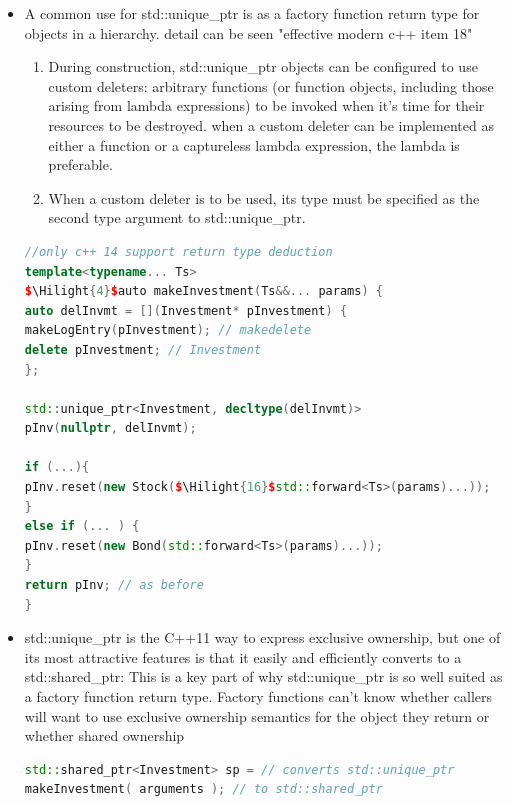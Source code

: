 \documentclass[a4paper,12pt,twoside]{book}
\newcommand{\Hilight}[1]{\makebox[0pt][l]{\color{yellow}\rule[-3pt]{#1em}{11pt}}}
\begin{document}
\begin{itemize}

\item A common use for std::unique\_ptr is as a factory function return type for objects
in a hierarchy. detail can be seen "effective modern c++ item 18"

\begin{enumerate}
\item During construction, std::unique\_ptr objects can be configured to use custom deleters: arbitrary functions (or function objects, including those arising from lambda expressions) to be invoked when it's time for their resources to be destroyed. when a custom deleter can be implemented as either a function or a captureless lambda expression, the lambda is preferable.

\item When a custom deleter is to be used, its type must be specified as the second type argument to std::unique\_ptr.
\end{enumerate}

\begin{lstlisting}[frame=single, language=c++, mathescape=true]
//only c++ 14 support return type deduction
template<typename... Ts>
$\Hilight{4}$auto makeInvestment(Ts&&... params) {
auto delInvmt = [](Investment* pInvestment) {
makeLogEntry(pInvestment); // makedelete
delete pInvestment; // Investment
};

std::unique_ptr<Investment, decltype(delInvmt)>
pInv(nullptr, delInvmt);

if (...){
pInv.reset(new Stock($\Hilight{16}$std::forward<Ts>(params)...));
}
else if (... ) {
pInv.reset(new Bond(std::forward<Ts>(params)...));
}
return pInv; // as before
}
\end{lstlisting}

\item std::unique\_ptr is the C++11 way to express exclusive ownership, but one of its
most attractive features is that it easily and efficiently converts to a std::shared\_ptr: This is a key part of why std::unique\_ptr is so well suited as a factory function return type. Factory functions can't know whether callers will want to use exclusive ownership semantics for the object they return or whether shared ownership
\begin{lstlisting}[frame=single, language=c++, mathescape=true]
std::shared_ptr<Investment> sp = // converts std::unique_ptr
makeInvestment( arguments ); // to std::shared_ptr
\end{lstlisting}


\end{itemize}
\end{document}
